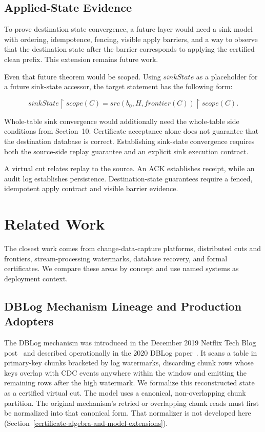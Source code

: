 \documentclass[letterpaper,10pt,twocolumn]{article}
\newcommand{\restrict}{\mathbin{\upharpoonright}}
\newcommand{\Src}{\mathit{src}}
\newcommand{\Scope}{\mathit{scope}}
\newcommand{\Frontier}{\mathit{frontier}}
\newcommand{\SinkState}{\mathit{sinkState}}
\begin{document}
\subsection{Applied-State Evidence}\label{applied-state-evidence}

To prove destination state convergence, a future layer would need a sink
model with ordering, idempotence, fencing, visible apply barriers, and a way
to observe that the destination state after the barrier corresponds to
applying the certified clean prefix. This extension remains future work.

Even that future theorem would be scoped. Using $\SinkState$ as a
placeholder for a future sink-state accessor, the target statement has
the following form:

\[
\SinkState \restrict \Scope(C)
  = \Src(b_0,H,\Frontier(C)) \restrict \Scope(C).
\]

Whole-table sink convergence would additionally need the whole-table
side conditions from Section~10. Certificate acceptance alone does not
guarantee that the destination database is correct. Establishing sink-state
convergence requires both the source-side replay guarantee and an explicit
sink execution contract.

A virtual cut relates replay to the source. An ACK establishes
receipt, while an audit log establishes persistence. Destination-state
guarantees require a fenced, idempotent apply contract and visible barrier
evidence.

\section{Related Work}\label{related-work}

The closest work comes from change-data-capture platforms, distributed
cuts and frontiers, stream-processing watermarks, database recovery,
and formal certificates. We compare these areas by concept and use
named systems as deployment context.

\subsection{DBLog Mechanism Lineage and Production
Adopters}\label{dblog-mechanism-lineage-and-production-adopters}

The DBLog mechanism was introduced in the December 2019 Netflix Tech
Blog post~\citep{dblog_netflix_blog} and described operationally in the
2020 DBLog paper~\citep{andreakis2020dblog}. It scans a table in
primary-key chunks bracketed by log watermarks, discarding chunk rows
whose keys overlap with CDC events anywhere within the window and
emitting the remaining rows after the high watermark. We
formalize this reconstructed state as a certified virtual cut. The model uses a canonical,
non-overlapping chunk partition. The original mechanism's retried or
overlapping chunk reads must first be normalized into that canonical
form. That normalizer is not developed here
(Section~\ref{certificate-algebra-and-model-extensions}).
\end{document}
